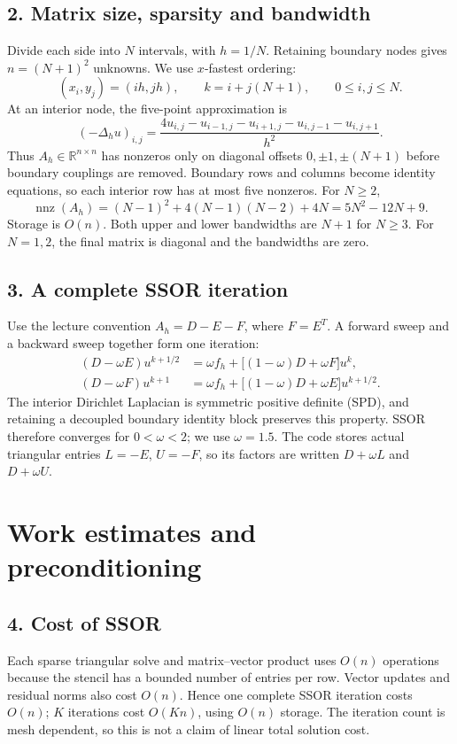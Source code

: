 \documentclass[10pt,a4paper]{article}
\newcommand{\Ah}{A_h}
\newcommand{\fh}{f_h}
\newcommand{\R}{\mathbb{R}}
\begin{document}
\subsection{2. Matrix size, sparsity and bandwidth}
Divide each side into $N$ intervals, with $h=1/N$. Retaining boundary nodes
gives $n=(N+1)^2$ unknowns. We use $x$-fastest ordering:
\[
 (x_i,y_j)=(ih,jh),\qquad k=i+j(N+1),\qquad 0\leq i,j\leq N.
\]
At an interior node, the five-point approximation is
\begin{equation}
 (-\Delta_h u)_{i,j}=\frac{4u_{i,j}-u_{i-1,j}-u_{i+1,j}-u_{i,j-1}-u_{i,j+1}}{h^2}.
 \label{eq:stencil}
\end{equation}
Thus $\Ah\in\R^{n\times n}$ has nonzeros only on diagonal offsets
$0,\pm1,\pm(N+1)$ before boundary couplings are removed. Boundary rows
and columns become identity equations, so each interior row has at most
five nonzeros. For $N\geq2$,
\[
 \operatorname{nnz}(\Ah)=(N-1)^2+4(N-1)(N-2)+4N=5N^2-12N+9.
\]
Storage is $O(n)$. Both upper and lower bandwidths are $N+1$ for $N\geq3$.
For $N=1,2$, the final matrix is diagonal and the bandwidths are zero.

\subsection{3. A complete SSOR iteration}
Use the lecture convention $\Ah=D-E-F$, where $F=E^T$.
A forward sweep and a backward sweep together form one iteration:
\begin{align}
 (D-\omega E)u^{k+1/2}
  &=\omega\fh+\bigl[(1-\omega)D+\omega F\bigr]u^k,\\
 (D-\omega F)u^{k+1}
  &=\omega\fh+\bigl[(1-\omega)D+\omega E\bigr]u^{k+1/2}.
\end{align}
The interior Dirichlet Laplacian is symmetric positive definite (SPD), and
retaining a decoupled boundary identity block preserves this property.
SSOR therefore converges for $0<\omega<2$; we use $\omega=1.5$.
The code stores actual triangular entries $L=-E$, $U=-F$, so its factors
are written $D+\omega L$ and $D+\omega U$.

\clearpage
\section{Work estimates and preconditioning}
\subsection{4. Cost of SSOR}
Each sparse triangular solve and matrix--vector product uses $O(n)$
operations because the stencil has a bounded number of entries per row.
Vector updates and residual norms also cost $O(n)$. Hence one complete
SSOR iteration costs $O(n)$; $K$ iterations cost $O(Kn)$, using $O(n)$
storage. The iteration count is mesh dependent, so this is not a claim
of linear total solution cost.
\end{document}
